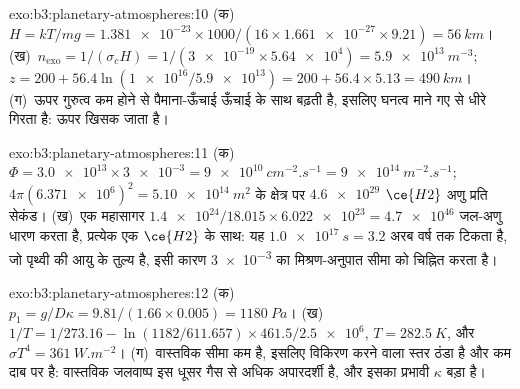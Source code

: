 \begin{solution}{exo:b3:planetary-atmospheres:10}
(क)~$H = kT/mg = \num{1.381e-23}\times1000/(16\times\num{1.661e-27}\times9.21)
= \qty{56}{km}$। (ख)~$n_\mathrm{exo} = 1/(\sigma_c H) = 1/(\num{3e-19}\times
\num{5.64e4}) = \qty{5.9e13}{m^{-3}}$; $z = 200 + 56.4\ln(\num{1e16}/
\num{5.9e13}) = 200 + 56.4\times5.13 = \qty{490}{km}$। (ग)~ऊपर गुरुत्व कम होने से
पैमाना-ऊँचाई ऊँचाई के साथ बढ़ती है, इसलिए घनत्व
माने गए से धीरे गिरता है:  ऊपर खिसक जाता है।
\end{solution}

\begin{solution}{exo:b3:planetary-atmospheres:11}
(क)~$\Phi = \num{3.0e13}\times\num{3e-3} = \qty{9e10}{cm^{-2}.s^{-1}} =
\qty{9e14}{m^{-2}.s^{-1}}$; $4\pi(\num{6.371e6})^2 =
\qty{5.10e14}{m^2}$ के क्षेत्र पर $\num{4.6e29}$ $\ce{H2}$ अणु प्रति सेकंड।
(ख)~एक महासागर $\num{1.4e24}/18.015\times\num{6.022e23} =
\num{4.7e46}$ जल-अणु धारण करता है, प्रत्येक एक $\ce{H2}$ के साथ: यह
$\qty{1.0e17}{s} = \num{3.2}\text{ अरब वर्ष}$ तक टिकता है, जो
पृथ्वी की आयु के तुल्य है, इसी कारण \num{3e-3} का मिश्रण-अनुपात  सीमा को चिह्नित करता है।
\end{solution}

\begin{solution}{exo:b3:planetary-atmospheres:12}
(क)~$p_1 = g/D\kappa = 9.81/(1.66\times0.005) = \qty{1180}{Pa}$।
(ख)~$1/T = 1/273.16 - \ln(1182/611.657)\times461.5/\num{2.5e6}$, $T =
\qty{282.5}{K}$, और $\sigma T^4 = \qty{361}{W.m^{-2}}$। (ग)~वास्तविक सीमा
कम है, इसलिए विकिरण करने वाला स्तर ठंडा है और कम दाब पर है: वास्तविक
जलवाष्प इस धूसर गैस से अधिक अपारदर्शी है, और इसका प्रभावी $\kappa$
बड़ा है।
\end{solution}

